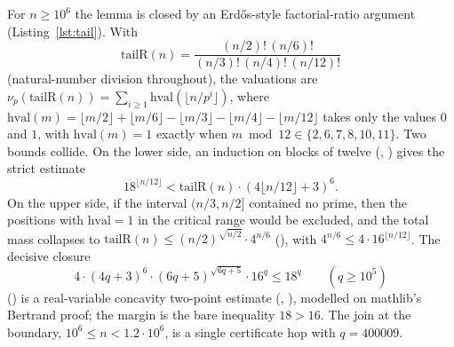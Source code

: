 \documentclass[11pt]{article}
\theoremstyle{definition}
\begin{document}
For $n \ge 10^{6}$ the lemma is closed by an Erd\H{o}s-style factorial-ratio
argument (Listing~\ref{lst:tail}). With
\[
\mathrm{tailR}(n) = \frac{(n/2)!\,(n/6)!}{(n/3)!\,(n/4)!\,(n/12)!}
\]
(natural-number division throughout), the valuations are
$\nu_p(\mathrm{tailR}(n)) = \sum_{i \ge 1} \mathrm{hval}(\lfloor n/p^{i}
\rfloor)$, where $\mathrm{hval}(m) = \lfloor m/2 \rfloor + \lfloor m/6
\rfloor - \lfloor m/3 \rfloor - \lfloor m/4 \rfloor - \lfloor m/12 \rfloor$
takes only the values $0$ and $1$, with $\mathrm{hval}(m) = 1$ exactly when
$m \bmod 12 \in \{2,6,7,8,10,11\}$. Two bounds collide. On the lower side, an
induction on blocks of twelve (,
) gives the strict estimate
\[
18^{\lfloor n/12 \rfloor} < \mathrm{tailR}(n) \cdot (4\lfloor n/12
\rfloor + 3)^{6}.
\]
On the upper side, if the interval $(n/3, n/2]$ contained no prime, then the
positions with $\mathrm{hval} = 1$ in the critical range would be excluded,
and the total mass collapses to
$\mathrm{tailR}(n) \le (n/2)^{\sqrt{n/2}} \cdot 4^{n/6}$
(), with $4^{n/6} \le 4 \cdot 16^{\lfloor n/12
\rfloor}$. The decisive closure
\[
4 \cdot (4q+3)^{6} \cdot (6q+5)^{\sqrt{6q+5}} \cdot 16^{q} \le 18^{q}
\qquad (q \ge 10^{5})
\]
() is a real-variable concavity two-point
estimate (, ), modelled
on mathlib's Bertrand proof; the margin is the bare inequality $18 > 16$.
The join at the boundary, $10^{6} \le n < 1.2 \cdot 10^{6}$, is a single
certificate hop with $q = 400009$.
\end{document}
